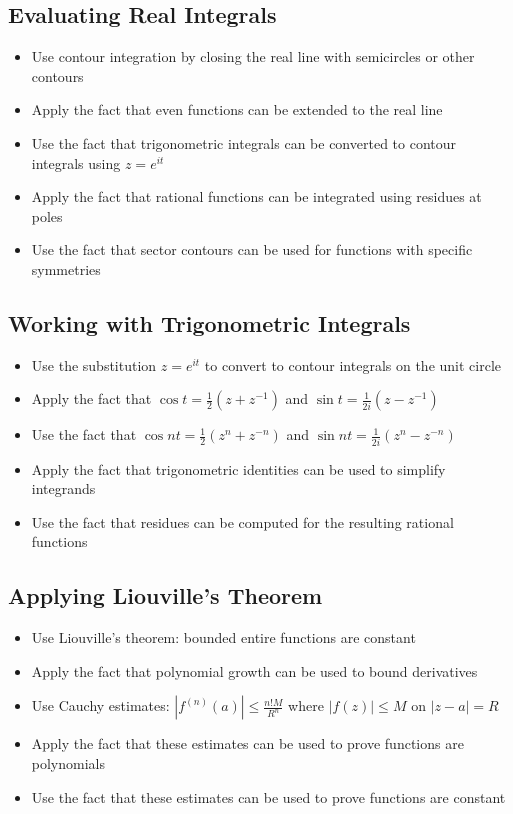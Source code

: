 \subsection*{Evaluating Real Integrals}
\begin{itemize}
\item Use contour integration by closing the real line with semicircles or other contours
\item Apply the fact that even functions can be extended to the real line
\item Use the fact that trigonometric integrals can be converted to contour integrals using $z = e^{it}$
\item Apply the fact that rational functions can be integrated using residues at poles
\item Use the fact that sector contours can be used for functions with specific symmetries
\end{itemize}

\subsection*{Working with Trigonometric Integrals}
\begin{itemize}
\item Use the substitution $z = e^{it}$ to convert to contour integrals on the unit circle
\item Apply the fact that $\cos t = \frac{1}{2}(z + z^{-1})$ and $\sin t = \frac{1}{2i}(z - z^{-1})$
\item Use the fact that $\cos nt = \frac{1}{2}(z^n + z^{-n})$ and $\sin nt = \frac{1}{2i}(z^n - z^{-n})$
\item Apply the fact that trigonometric identities can be used to simplify integrands
\item Use the fact that residues can be computed for the resulting rational functions
\end{itemize}

\subsection*{Applying Liouville's Theorem}
\begin{itemize}
\item Use Liouville's theorem: bounded entire functions are constant
\item Apply the fact that polynomial growth can be used to bound derivatives
\item Use Cauchy estimates: $|f^{(n)}(a)| \leq \frac{n! M}{R^n}$ where $|f(z)| \leq M$ on $|z-a| = R$
\item Apply the fact that these estimates can be used to prove functions are polynomials
\item Use the fact that these estimates can be used to prove functions are constant
\end{itemize}

